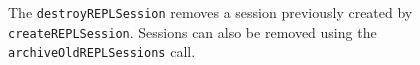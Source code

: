 The \verb+destroyREPLSession+ removes a session previously created by \verb+createREPLSession+.
Sessions can also be removed using the \verb+archiveOldREPLSessions+ call.
